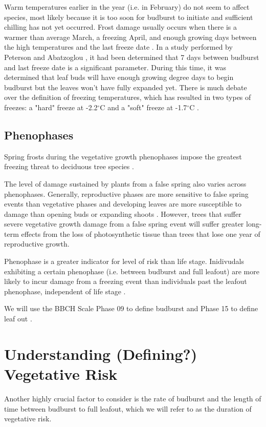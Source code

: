 \documentclass{article}\usepackage[]{graphicx}\usepackage[]{color}
\begin{document}
Warm temperatures earlier in the year (i.e. in February) do not seem to affect species, most likely because it is too soon for budburst to initiate and sufficient chilling has not yet occurred. Frost damage usually occurs when there is a warmer than average March, a freezing April, and enough growing days between the high temperatures and the last freeze date \citep{Augspurger2013}. 
In a study performed by Peterson and Abatzoglou \citeyear{Peterson2014}, it had been determined that 7 days between budburst and last freeze date is a significant parameter. During this time, it was determined that leaf buds will have enough growing degree days to begin budburst but the leaves won't have fully expanded yet. There is much debate over the definition of freezing temperatures, which has resulted in two types of freezes: a "hard" freeze at -2.2$^{\circ}$C and a "soft" freeze at -1.7$^{\circ}$C \citep{Augspurger2013, Kodra2011, Vavrus2006}.

\subsection*{Phenophases}
Spring frosts during the vegetative growth phenophases impose the greatest freezing threat to deciduous tree species \citep{Sakai1987}.

The level of damage sustained by plants from a false spring also varies across phenophases. Generally, reproductive phases are more sensitive to false spring events than vegetative phases and developing leaves are more susceptible to damage than opening buds or expanding shoots \citep{Lenz2013,Augspurger2009}. However, trees that suffer severe vegetative growth damage from a false spring event will suffer greater long-term effects from the loss of photosynthetic tissue than trees that lose one year of reproductive growth.

Phenophase is a greater indicator for level of risk than life stage. Inidivudals exhibiting a certain phenophase (i.e. between budburst and full leafout) are more likely to incur damage from a freezing event than individuals past the leafout phenophase, independent of life stage \citep{Augspurger2009,Vitasse2014}.

We will use the BBCH Scale Phase 09 to define budburst and Phase 15 to define leaf out \citep{Meier2001}.

\section*{Understanding (Defining?) Vegetative Risk}
Another highly crucial factor to consider is the rate of budburst and the length of time between budburst to full leafout, which we will refer to as the duration of vegetative risk.
\end{document}

